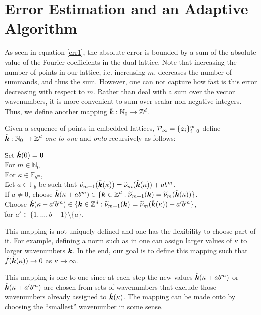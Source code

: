 \documentclass[graybox]{svmult}
\newcommand{\Z}{\mathbb{Z}} %
\newcommand{\N}{\mathbb{N}} %
\newcommand{\F}{\mathbb{F}} %
\newcommand{\bszero}{\boldsymbol{0}} %
\newcommand{\bsz}{\boldsymbol{z}}    %
\begin{document}
\section{Error Estimation and an Adaptive Algorithm}\label{secalgo}

As seen in equation \eqref{err1}, the absolute error is bounded by a sum of the absolute value of the Fourier coefficients in the dual lattice. Note that increasing the number of points in our lattice, i.e. increasing $m$, decreases the number of summands, and thus the sum. However, one can not capture how fast is this error decreasing with respect to $m$.  Rather than deal with a sum over the vector wavenumbers, it is more convenient to sum over scalar non-negative integers.  Thus, we define another mapping $\tvk: \N_0 \to \Z^d$.

\begin{definition} \label{wavenummapdef} Given a sequence of points in embedded lattices, $\cp_{\infty} = \{\bsz_i\}_{i=0}^{\infty}$ define $\tvk: \N_0 \to \Z^d$ \emph{one-to-one} and \emph{onto} recursively as follows:
\begin{tabbing}
\hspace{0.5cm} \= Set $\tvk(0)=\bszero$ \+ \\
For $m\in \N_0$ \\
\hspace{0.3cm} \= For $\kappa \in \F_{b^m}$,  \+ \\
\hspace{0.3cm} \= Let $a\in \F_b$ be such that $\widetilde{\nu}_{m+1}(\tilde{\boldsymbol{k}}(\kappa))= \widetilde{\nu}_{m}(\tilde{\boldsymbol{k}}(\kappa)) + ab^m$. \+ \\
If $a\ne 0$, choose $\tvk(\kappa+a b^m) \in \{\bsk \in  \Z^d : \tnu_{m+1}(\bsk)=\tnu_{m}(\tvk(\kappa))\}$. \\
Choose $\tvk(\kappa+a' b^m) \in \{\bsk \in  \Z^d : \tnu_{m+1}(\bsk)=\tnu_{m}(\tvk(\kappa))+a' b^m \}$, \\ \` for  $a'\in \{1, \ldots, b-1\}\setminus \{a\}$.
\end{tabbing}
\end{definition}

This mapping is not uniquely defined and one has the flexibility to choose part of it. For example, defining a norm such as in \cite[Chap. 4]{SloJoe94} one can assign larger values of $\kappa$ to larger wavenumbers $\boldsymbol{k}$. In the end, our goal is to define this mapping such that $\hat{f}(\tilde{\boldsymbol{k}}(\kappa))\rightarrow 0$ as $\kappa \to \infty$.



This mapping is one-to-one since at each step the new values $\tilde{\boldsymbol{k}}(\kappa+a b^m)$ or $\tilde{\boldsymbol{k}}(\kappa+a' b^m)$ are chosen from sets of wavenumbers that exclude those wavenumbers already assigned to $\tilde{\boldsymbol{k}}(\kappa)$.  The mapping can be made onto by choosing the ``smallest'' wavenumber in some sense. 
\end{document}
